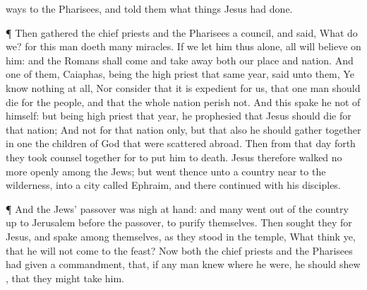 {ways
to the
Pharisees,
and
told
them what
things
Jesus had
done.
\par }{\PP {}¶
Then
gathered the chief
priests
and the
Pharisees a
council,
and
said,
What do
we?
for
this
man
doeth
many
miracles.
If we
let
him thus
alone,
all
{} will
believe
on
him:
and the
Romans shall
come
and take
away
both
our
place
and
nation.
And
one
of
them,
{}
Caiaphas,
being the high
priest that
same
year,
said unto
them,
Ye
know
nothing at
all,
Nor
consider
that it is
expedient for
us,
that
one
man should
die
for the
people,
and
that the
whole
nation
perish
not.
And
this spake
he
not
of
himself:
but
being high
priest
that
year, he
prophesied
that
Jesus
should
die
for that
nation;
And
not
for that
nation
only,
but
that
also he should gather
together
in
one the
children of
God that were scattered
abroad.
Then
from
that
day
forth they took counsel
together
for to
put
him to
death.
Jesus
therefore
walked
no
more
openly
among the
Jews;
but
went
thence
unto a
country near
to the
wilderness,
into a
city
called
Ephraim, and
there
continued
with
his
disciples.
\par }{\PP {}¶
And the
Jews’
passover
was nigh at
hand:
and
many
went out
of the
country up
to
Jerusalem
before the
passover,
to
purify
themselves.
Then sought
they for
Jesus,
and
spake
among
themselves, as they
stood
in the
temple,
What
think
ye,
that he
will
not
come
to the
feast?
Now
both the chief
priests
and the
Pharisees had
given a
commandment,
that,
if any
man
knew
where he
were, he should
shew
{},
that they might
take
him.

}
